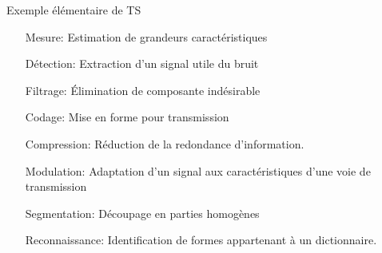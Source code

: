 \documentclass{beamer}
\begin{document}
\begin{frame}{Exemple élémentaire de TS}
  \setlength{\leftmargini}{2.5cm}         %
  \begin{itemize}
    \item[Mesure:\pause] Estimation de grandeurs caractéristiques\pause
    \item[Détection:\pause] Extraction d'un signal utile du bruit\pause
    \item[Filtrage:\pause] Élimination de composante indésirable\pause
    \item[Codage:\pause] Mise en forme pour transmission\pause
    \item[Compression:\pause] Réduction de la redondance d'information.\pause
    \item[Modulation:\pause] Adaptation d'un signal aux caractéristiques d'une voie de transmission\pause
    \item[Segmentation:\pause] Découpage en parties homogènes\pause
    \item[Reconnaissance:\pause] Identification de formes appartenant à un dictionnaire.\pause
  \end{itemize}
\end{frame}
\end{document}
